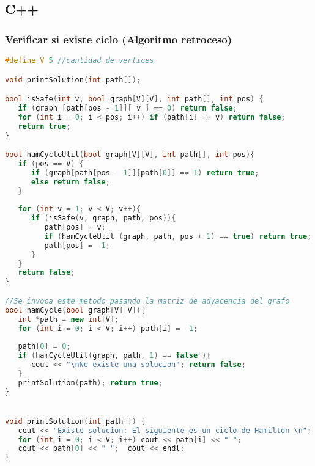\subsection{C++}

\subsubsection{Verificar si existe ciclo (Algoritmo retroceso)}
\begin{lstlisting}[language=C++]
#define V 5 //cantidad de vertices

void printSolution(int path[]); 

bool isSafe(int v, bool graph[V][V], int path[], int pos) { 
   if (graph [path[pos - 1]][ v ] == 0) return false; 
   for (int i = 0; i < pos; i++) if (path[i] == v) return false; 
   return true; 
} 

bool hamCycleUtil(bool graph[V][V], int path[], int pos){ 
   if (pos == V) { 
      if (graph[path[pos - 1]][path[0]] == 1) return true; 
      else return false; 
   } 
	
   for (int v = 1; v < V; v++){ 
      if (isSafe(v, graph, path, pos)){ 
         path[pos] = v; 
         if (hamCycleUtil (graph, path, pos + 1) == true) return true; 
         path[pos] = -1; 
      } 
   } 
   return false; 
} 

//Se invoca este metodo pasando la matriz de adyacencia del grafo
bool hamCycle(bool graph[V][V]){ 
   int *path = new int[V]; 
   for (int i = 0; i < V; i++) path[i] = -1; 
   
   path[0] = 0; 
   if (hamCycleUtil(graph, path, 1) == false ){ 
      cout << "\nNo existe una solucion"; return false; 
   } 
   printSolution(path); return true; 
} 


void printSolution(int path[]) { 
   cout << "Existe solucion: El siguiente es un ciclo de Hamilton \n"; 
   for (int i = 0; i < V; i++) cout << path[i] << " "; 
   cout << path[0] << " ";  cout << endl;
} 
\end{lstlisting}


